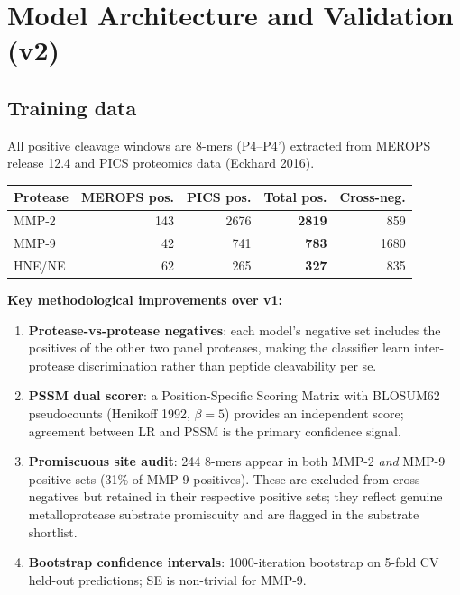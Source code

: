 \documentclass[10pt,a4paper]{article}
\begin{document}
\section{Model Architecture and Validation (v2)}

\subsection{Training data}

All positive cleavage windows are 8-mers (P4--P4') extracted from
MEROPS release 12.4 and PICS proteomics data (Eckhard 2016).

\begin{center}
\begin{tabular}{lrrrr}
  \toprule
  Protease & MEROPS pos. & PICS pos. & \textbf{Total pos.} & Cross-neg.\\
  \midrule
  MMP-2  & \phantom{0}143 & 2676 & \textbf{2819} & 859\\
  MMP-9  & \phantom{00}42 &  741 &  \textbf{783} & 1680\\
  HNE/NE & \phantom{00}62 &  265 &  \textbf{327} & 835\\
  \bottomrule
\end{tabular}
\end{center}

\textbf{Key methodological improvements over v1:}
\begin{enumerate}[leftmargin=*,topsep=2pt,itemsep=0pt]
  \item \textbf{Protease-vs-protease negatives}: each model's negative set
    includes the positives of the other two panel proteases, making the
    classifier learn inter-protease discrimination rather than peptide
    cleavability per se.
  \item \textbf{PSSM dual scorer}: a Position-Specific Scoring Matrix with
    BLOSUM62 pseudocounts (Henikoff 1992, $\beta{=}5$) provides an independent
    score; agreement between LR and PSSM is the primary confidence signal.
  \item \textbf{Promiscuous site audit}: 244 8-mers appear in both MMP-2
    \emph{and} MMP-9 positive sets (31\% of MMP-9 positives).  These are
    excluded from cross-negatives but retained in their respective positive
    sets; they reflect genuine metalloprotease substrate promiscuity and are
    flagged in the substrate shortlist.
  \item \textbf{Bootstrap confidence intervals}: 1000-iteration bootstrap
    on 5-fold CV held-out predictions; SE is non-trivial for MMP-9.
\end{enumerate}
\end{document}
